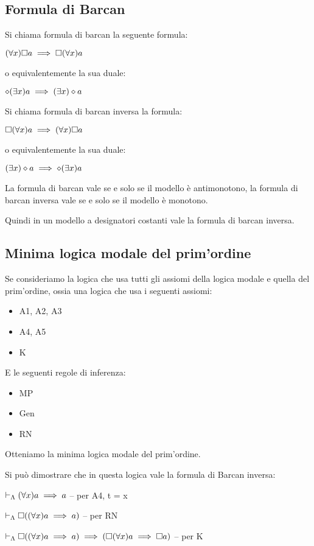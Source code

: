 \subsection{Formula di Barcan}

Si chiama formula di barcan la seguente formula:

$(\forall x)\square a\implies\square(\forall x)a$

o equivalentemente la sua duale:

$\diamond(\exists x)a\implies(\exists x)\diamond a$

Si chiama formula di barcan inversa la formula:

$\square(\forall x)a\implies(\forall x)\square a$

o equivalentemente la sua duale:

$(\exists x)\diamond a\implies\diamond(\exists x)a$

La formula di barcan vale se e solo se il modello è antimonotono,
la formula di barcan inversa vale se e solo se il modello è monotono.

Quindi in un modello a designatori costanti vale la formula di barcan
inversa.


\subsection{Minima logica modale del prim'ordine}

Se consideriamo la logica che usa tutti gli assiomi della logica modale
e quella del prim'ordine, ossia una logica che usa i seguenti assiomi:
\begin{itemize}
\item A1, A2, A3
\item A4, A5
\item K
\end{itemize}
E le seguenti regole di inferenza:
\begin{itemize}
\item MP
\item Gen
\item RN
\end{itemize}
Otteniamo la minima logica modale del prim'ordine.

Si può dimostrare che in questa logica vale la formula di Barcan inversa:

$\vdash_{\Lambda}(\forall x)a\implies a$ -- per A4, t = x

$\vdash_{\Lambda}\square((\forall x)a\implies a)$ -- per RN

$\vdash_{\Lambda}\square((\forall x)a\implies a)\implies(\square(\forall x)a\implies\square a)$
-- per K

